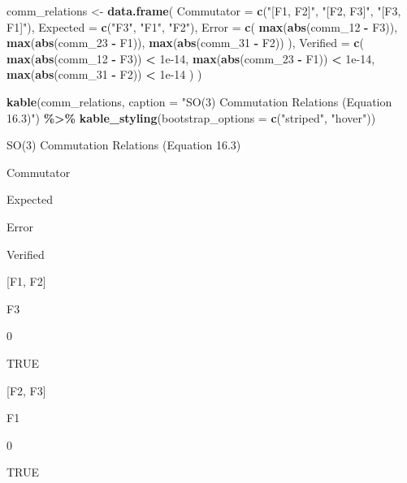 \documentclass[
]{book}
\newenvironment{Shaded}{\begin{snugshade}}{\end{snugshade}}
\newcommand{\AttributeTok}[1]{\textcolor[rgb]{0.13,0.29,0.53}{#1}}
\newcommand{\FloatTok}[1]{\textcolor[rgb]{0.00,0.00,0.81}{#1}}
\newcommand{\FunctionTok}[1]{\textcolor[rgb]{0.13,0.29,0.53}{\textbf{#1}}}
\newcommand{\NormalTok}[1]{#1}
\newcommand{\OtherTok}[1]{\textcolor[rgb]{0.56,0.35,0.01}{#1}}
\newcommand{\SpecialCharTok}[1]{\textcolor[rgb]{0.81,0.36,0.00}{\textbf{#1}}}
\newcommand{\StringTok}[1]{\textcolor[rgb]{0.31,0.60,0.02}{#1}}
\theoremstyle{definition}
\theoremstyle{definition}
\theoremstyle{definition}
\theoremstyle{definition}
\theoremstyle{remark}
\begin{document}
\begin{Shaded}
\begin{Highlighting}[]
\NormalTok{comm\_relations }\OtherTok{\textless{}{-}} \FunctionTok{data.frame}\NormalTok{(}
  \AttributeTok{Commutator =} \FunctionTok{c}\NormalTok{(}\StringTok{"[F1, F2]"}\NormalTok{, }\StringTok{"[F2, F3]"}\NormalTok{, }\StringTok{"[F3, F1]"}\NormalTok{),}
  \AttributeTok{Expected =} \FunctionTok{c}\NormalTok{(}\StringTok{"F3"}\NormalTok{, }\StringTok{"F1"}\NormalTok{, }\StringTok{"F2"}\NormalTok{),}
  \AttributeTok{Error =} \FunctionTok{c}\NormalTok{(}
    \FunctionTok{max}\NormalTok{(}\FunctionTok{abs}\NormalTok{(comm\_12 }\SpecialCharTok{{-}}\NormalTok{ F3)),}
    \FunctionTok{max}\NormalTok{(}\FunctionTok{abs}\NormalTok{(comm\_23 }\SpecialCharTok{{-}}\NormalTok{ F1)),}
    \FunctionTok{max}\NormalTok{(}\FunctionTok{abs}\NormalTok{(comm\_31 }\SpecialCharTok{{-}}\NormalTok{ F2))}
\NormalTok{  ),}
  \AttributeTok{Verified =} \FunctionTok{c}\NormalTok{(}
    \FunctionTok{max}\NormalTok{(}\FunctionTok{abs}\NormalTok{(comm\_12 }\SpecialCharTok{{-}}\NormalTok{ F3)) }\SpecialCharTok{\textless{}} \FloatTok{1e{-}14}\NormalTok{,}
    \FunctionTok{max}\NormalTok{(}\FunctionTok{abs}\NormalTok{(comm\_23 }\SpecialCharTok{{-}}\NormalTok{ F1)) }\SpecialCharTok{\textless{}} \FloatTok{1e{-}14}\NormalTok{,}
    \FunctionTok{max}\NormalTok{(}\FunctionTok{abs}\NormalTok{(comm\_31 }\SpecialCharTok{{-}}\NormalTok{ F2)) }\SpecialCharTok{\textless{}} \FloatTok{1e{-}14}
\NormalTok{  )}
\NormalTok{)}

\FunctionTok{kable}\NormalTok{(comm\_relations,}
      \AttributeTok{caption =} \StringTok{"SO(3) Commutation Relations (Equation 16.3)"}\NormalTok{) }\SpecialCharTok{\%\textgreater{}\%}
  \FunctionTok{kable\_styling}\NormalTok{(}\AttributeTok{bootstrap\_options =} \FunctionTok{c}\NormalTok{(}\StringTok{"striped"}\NormalTok{, }\StringTok{"hover"}\NormalTok{))}
\end{Highlighting}
\end{Shaded}

\label{tab:so3-basis}SO(3) Commutation Relations (Equation 16.3)

Commutator

Expected

Error

Verified

{[}F1, F2{]}

F3

0

TRUE

{[}F2, F3{]}

F1

0

TRUE
\end{document}
